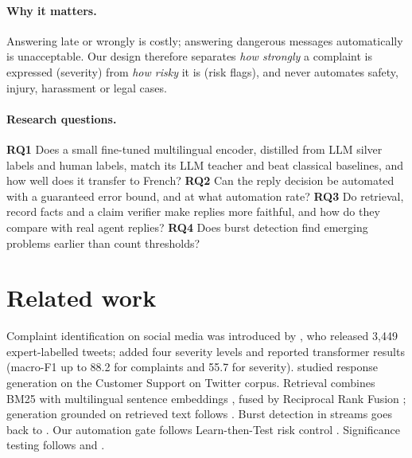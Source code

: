 \documentclass[11pt,a4paper]{article}
\begin{document}
\paragraph{Why it matters.} Answering late or wrongly is costly; answering dangerous messages
automatically is unacceptable. Our design therefore separates \emph{how strongly} a complaint is
expressed (severity) from \emph{how risky} it is (risk flags), and never automates safety, injury,
harassment or legal cases.

\paragraph{Research questions.}
\textbf{RQ1} Does a small fine-tuned multilingual encoder, distilled from LLM silver labels and human
labels, match its LLM teacher and beat classical baselines, and how well does it transfer to French?
\textbf{RQ2} Can the reply decision be automated with a guaranteed error bound, and at what
automation rate?
\textbf{RQ3} Do retrieval, record facts and a claim verifier make replies more faithful, and how do
they compare with real agent replies?
\textbf{RQ4} Does burst detection find emerging problems earlier than count thresholds?

\section{Related work}
Complaint identification on social media was introduced by \citet{preotiuc2019complaints}, who
released 3{,}449 expert-labelled tweets; \citet{jin2021severity} added four severity levels and
reported transformer results (macro-F1 up to 88.2 for complaints and 55.7 for severity).
\citet{hardalov2018support} studied response generation on the Customer Support on Twitter corpus.
Retrieval combines BM25 \citep{robertson2009bm25} with multilingual sentence embeddings
\citep{reimers2020multilingual}, fused by Reciprocal Rank Fusion \citep{cormack2009rrf}; generation
grounded on retrieved text follows \citet{lewis2020rag}. Burst detection in streams goes back to
\citet{kleinberg2003bursty}. Our automation gate follows Learn-then-Test risk control
\citep{angelopoulos2021ltt}. Significance testing follows \citet{dror2018hitchhiker} and
\citet{bergkirkpatrick2012significance}.
\end{document}
